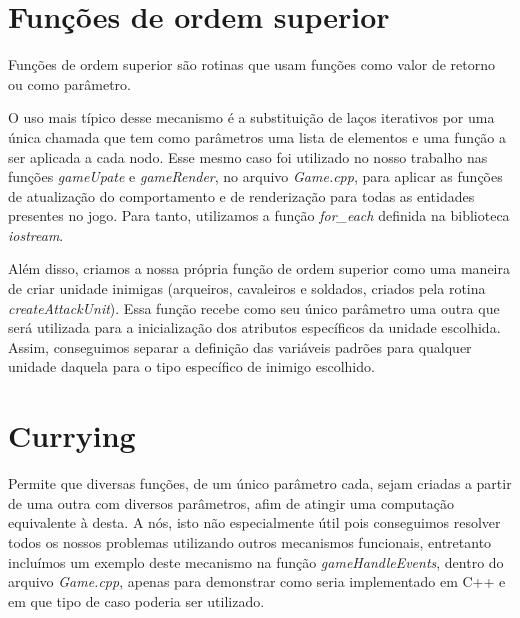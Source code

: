 \documentclass[rel_mlp]{iiufrgs}
\begin{document}
 \section{Funções de ordem superior}

	Funções de ordem superior são rotinas que usam funções como valor de retorno ou como parâmetro.

	O uso mais típico desse mecanismo é a substituição de laços iterativos por uma única chamada que tem como parâmetros uma lista de elementos e uma função a ser aplicada a cada nodo. Esse mesmo caso foi utilizado no nosso trabalho nas funções \textit{gameUpate} e \textit{gameRender}, no arquivo \textit{Game.cpp}, para aplicar as funções de atualização do comportamento e de renderização para todas as entidades presentes no jogo. Para tanto, utilizamos a função \textit{for\_each}	definida na biblioteca \textit{iostream}.

	Além disso, criamos a nossa própria função de ordem superior como uma maneira de criar unidade inimigas (arqueiros, cavaleiros e soldados, criados pela rotina \textit{createAttackUnit}). Essa função recebe como seu único parâmetro uma outra que será utilizada para a inicialização dos atributos específicos da unidade escolhida. Assim, conseguimos separar a definição das variáveis padrões para qualquer unidade daquela para o tipo específico de inimigo escolhido.

 \section{Currying}
 
	Permite que diversas funções, de um único parâmetro cada, sejam criadas a partir de uma outra com diversos parâmetros, afim de atingir uma computação equivalente à desta. A nós, isto não especialmente útil pois conseguimos resolver todos os nossos problemas utilizando outros mecanismos funcionais, entretanto incluímos um exemplo deste mecanismo na função \textit{gameHandleEvents}, dentro do arquivo \textit{Game.cpp}, apenas para demonstrar como seria implementado em C++ e em que tipo de caso poderia ser utilizado.


%

%

\end{document}
